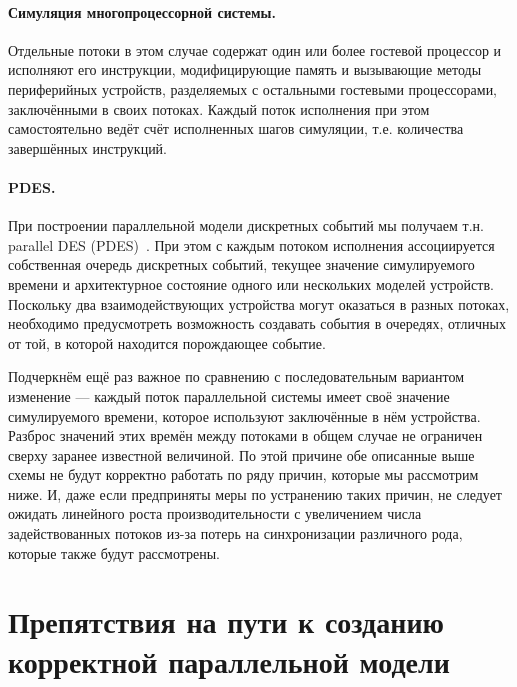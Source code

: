 \paragraph{Симуляция многопроцессорной системы.} Отдельные потоки в этом случае содержат один или более гостевой процессор и исполняют его инструкции, модифицирующие память и вызывающие методы периферийных устройств, разделяемых с остальными гостевыми процессорами, заключёнными в своих потоках. Каждый поток исполнения при этом самостоятельно ведёт счёт исполненных шагов симуляции, т.е. количества завершённых инструкций.

\paragraph{PDES.} При построении параллельной модели дискретных событий мы получаем т.н. parallel DES (PDES)~\cite{fujimoto-parallel-dist-sim, Fujimoto-pdes, Liu09paralleldiscrete-event, ferscha-1995-pdes}. При этом с каждым потоком исполнения ассоциируется собственная очередь дискретных событий, текущее значение симулируемого времени и архитектурное состояние одного или нескольких моделей устройств. Поскольку два взаимодействующих устройства могут оказаться в разных потоках, необходимо предусмотреть возможность создавать события в очередях, отличных от той, в которой находится порождающее событие.


Подчеркнём ещё раз важное по сравнению с последовательным вариантом изменение --- каждый поток параллельной системы имеет своё значение симулируемого времени, которое используют заключённые в нём устройства. Разброс значений этих времён между потоками в общем случае не ограничен сверху заранее известной величиной. По этой причине обе описанные выше схемы не будут корректно работать по ряду причин, которые мы рассмотрим ниже. И, даже если предприняты меры по устранению таких причин, не следует ожидать линейного роста производительности с увеличением числа задействованных потоков из-за потерь на синхронизации различного рода, которые также будут рассмотрены.

\section[Препятствия параллельной модели]{Препятствия на пути к созданию корректной параллельной модели}

